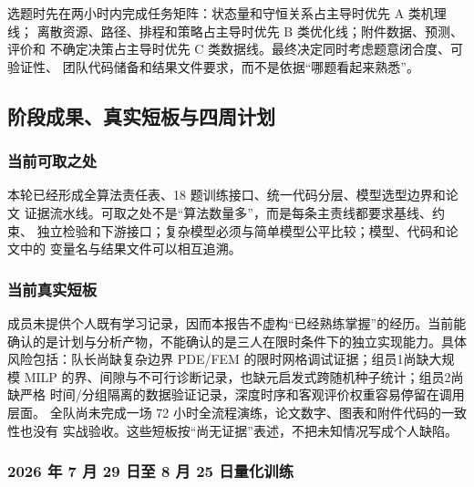 \documentclass[UTF8,a4paper,12pt]{ctexart}
\begin{document}
选题时先在两小时内完成任务矩阵：状态量和守恒关系占主导时优先 A 类机理线；
离散资源、路径、排程和策略占主导时优先 B 类优化线；附件数据、预测、评价和
不确定决策占主导时优先 C 类数据线。最终决定同时考虑题意闭合度、可验证性、
团队代码储备和结果文件要求，而不是依据“哪题看起来熟悉”。

\subsection{阶段成果、真实短板与四周计划}

\subsubsection{当前可取之处}

本轮已经形成全算法责任表、18 题训练接口、统一代码分层、模型选型边界和论文
证据流水线。可取之处不是“算法数量多”，而是每条主责线都要求基线、约束、
独立检验和下游接口；复杂模型必须与简单模型公平比较；模型、代码和论文中的
变量名与结果文件可以相互追溯。

\subsubsection{当前真实短板}

成员未提供个人既有学习记录，因而本报告不虚构“已经熟练掌握”的经历。当前能
确认的是计划与分析产物，不能确认的是三人在限时条件下的独立实现能力。具体
风险包括：队长尚缺复杂边界 PDE/FEM 的限时网格调试证据；组员1尚缺大规模
MILP 的界、间隙与不可行诊断记录，也缺元启发式跨随机种子统计；组员2尚缺严格
时间/分组隔离的数据验证记录，深度时序和客观评价权重容易停留在调用层面。
全队尚未完成一场 72 小时全流程演练，论文数字、图表和附件代码的一致性也没有
实战验收。这些短板按“尚无证据”表述，不把未知情况写成个人缺陷。

\subsubsection{2026 年 7 月 29 日至 8 月 25 日量化训练}
\end{document}
